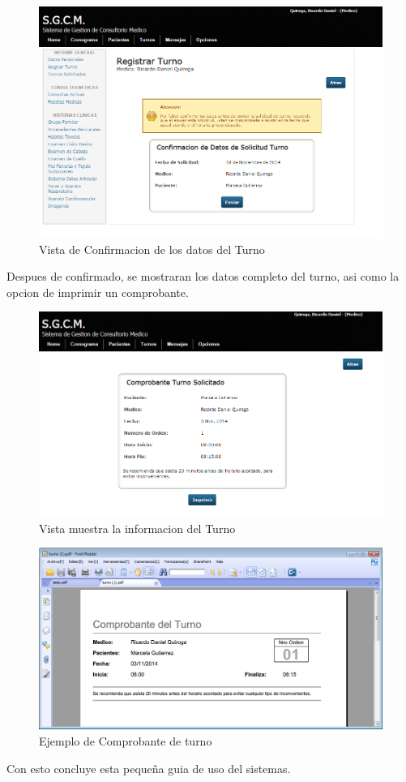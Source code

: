 \begin{figure}[H]
    \centering
    \includegraphics[scale=0.5]{resourse/confirmacion-turno.png}
    \caption{Vista de Confirmacion de los datos del Turno}
    \label{fig:623}
\end{figure}

Despues de confirmado, se mostraran los datos completo del turno, asi como la
opcion de imprimir un comprobante.


\begin{figure}[H]
    \centering
    \includegraphics[scale=0.5]{resourse/datos-turno.png}
    \caption{Vista muestra la informacion del Turno}
    \label{fig:624}
\end{figure}


\begin{figure}[H]
    \centering
    \includegraphics[scale=0.5]{resourse/comprobante-turno.png}
    \caption{Ejemplo de Comprobante de turno}
    \label{fig:625}
\end{figure}

Con esto concluye esta pequeña guia de uso del sistemas.












